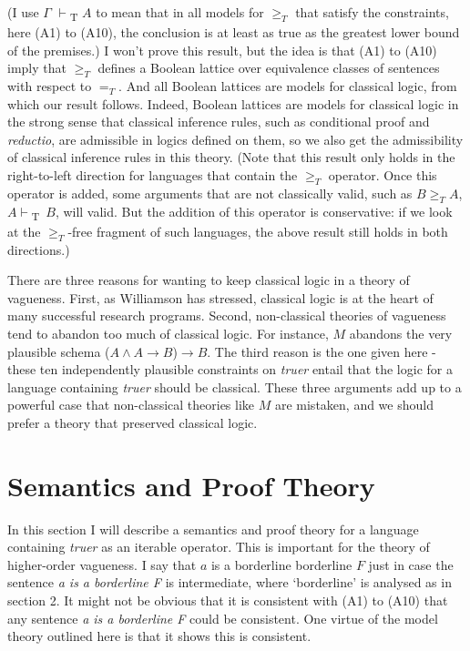 \noindent (I use   \(\Gamma\) \(\vdash\)\textsubscript{T} \(A\) to mean that in all models for \(\geqslant _T\) that satisfy the constraints, here (A1) to (A10), the conclusion is at least as true as the greatest lower bound of the premises.) I won't prove this result, but the idea is that (A1) to (A10) imply that \(\geqslant _T\) defines a Boolean lattice over equivalence classes of sentences with respect to \(=_T\). And all Boolean lattices are models for classical logic, from which our result follows. Indeed, Boolean lattices are models for classical logic in the strong sense that classical inference rules, such as conditional proof and \textit{reductio}, are admissible in logics defined on them, so we also get the admissibility of classical inference rules in this theory. (Note that this result only holds in the right-to-left direction for languages that contain the \(\geqslant _T\) operator. Once this operator is added, some arguments that are not classically valid, such as \(B \geqslant _T A\), \(A \vdash\)\textsubscript{T}~\(B\), will valid. But the addition of this operator is conservative: if we look at the \(\geqslant _T\){}-free fragment of such languages, the above result still holds in both directions.)

There are three reasons for wanting to keep classical logic in a theory of vagueness. First, as Williamson has stressed, classical logic is at the heart of many successful research programs. Second, non-classical theories of vagueness tend to abandon too much of classical logic. For instance, \(M\) abandons the very plausible schema (\(A \wedge A \rightarrow B\))\(\rightarrow B\). The third reason is the one given here - these ten independently plausible constraints on \textit{truer} entail that the logic for a language containing \textit{truer} should be classical. These three arguments add up to a powerful case that non-classical theories like \(M\) are mistaken, and we should prefer a theory that preserved classical logic.

\section{Semantics and Proof Theory}
In this section I will describe a semantics and proof theory for a language containing \textit{truer} as an iterable operator. This is important for the theory of higher-order vagueness. I say that \(a\) is a borderline borderline \(F\) just in case the sentence \textit{a is a borderline F} is intermediate, where `borderline' is analysed as in section 2. It might not be obvious that it is consistent with (A1) to (A10) that any sentence \textit{a is a borderline F} could be consistent. One virtue of the model theory outlined here is that it shows this is consistent.

